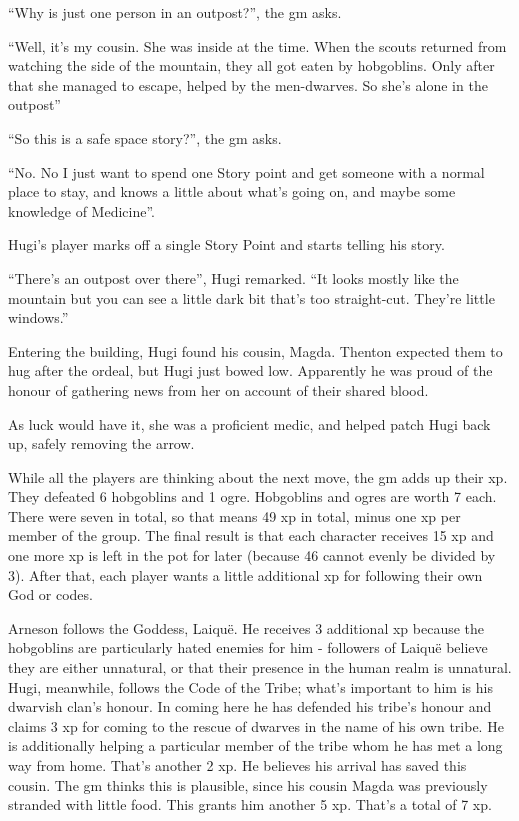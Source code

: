 \begin{multicols}{2}
{\begin{exampletext}
	``Why is just one person in an outpost?'', the \gls{gm} asks.
	
	``Well, it's my cousin.
	She was inside at the time. When the scouts returned from watching the side of the mountain, they all got eaten by hobgoblins.
	Only after that she managed to escape, helped by the men-dwarves. So she's alone in the outpost''
	
	``So this is a safe space story?'', the \gls{gm} asks.
	
	``No. No I just want to spend one Story point and get someone with a normal place to stay, and knows a little about what's going on, and maybe some knowledge of Medicine''.
	
	Hugi's player marks off a single Story Point and starts telling his story.
	
	``There's an outpost over there'', Hugi remarked.
	``It looks mostly like the mountain but you can see a little dark bit that's too straight-cut.
	They're little windows.''
	
	Entering the building, Hugi found his cousin, Magda.
	Thenton expected them to hug after the ordeal, but Hugi just bowed low.
	Apparently he was proud of the honour of gathering news from her on account of their shared blood.
	
	As luck would have it, she was a proficient medic, and helped patch Hugi back up, safely removing the arrow.
	
While all the players are thinking about the next move, the \gls{gm} adds up their \gls{xp}. They defeated 6 hobgoblins and 1 ogre. Hobgoblins and ogres are worth 7 each. There were seven in total, so that means 49 \gls{xp} in total, minus one \gls{xp} per member of the group. The final result is that each character receives 15 \gls{xp} and one more \gls{xp} is left in the pot for later (because 46 cannot evenly be divided by 3). After that, each player wants a little additional \gls{xp} for following their own God or codes.

Arneson follows the Goddess, Laiqu\"{e}.
He receives 3 additional \gls{xp} because the hobgoblins are particularly hated enemies for him - followers of Laiqu\"{e} believe they are either unnatural, or that their presence in the human realm is unnatural.
Hugi, meanwhile, follows the Code of the Tribe; what's important to him is his dwarvish clan's honour.
In coming here he has defended his tribe's honour and claims 3 \gls{xp} for coming to the rescue of dwarves in the name of his own tribe.
He is additionally helping a particular member of the tribe whom he has met a long way from home.
That's another 2 \gls{xp}.
He believes his arrival has saved this cousin.
The \gls{gm} thinks this is plausible, since his cousin Magda was previously stranded with little food.
This grants him another 5 \gls{xp}.
That's a total of 7 \gls{xp}.


\end{exampletext}}
\end{multicols}
